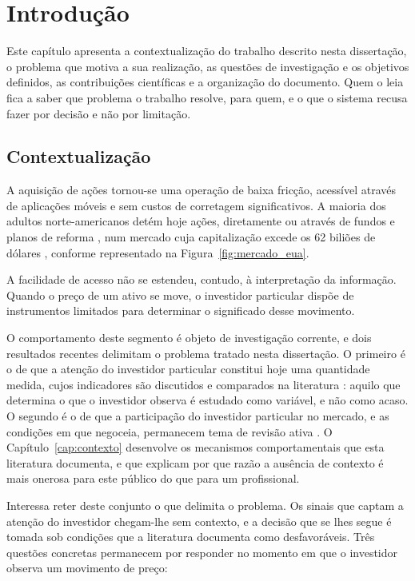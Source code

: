 \chapter{Introdução}
\label{cap:introducao}

Este capítulo apresenta a contextualização do trabalho descrito nesta dissertação, o problema
que motiva a sua realização, as questões de investigação e os objetivos definidos, as
contribuições científicas e a organização do documento. Quem o leia fica a saber que problema o trabalho resolve, para quem, e o que o sistema recusa fazer por decisão e não por limitação.

\section{Contextualização}
\label{sec:intro_origem}

A aquisição de ações tornou-se uma operação de baixa fricção, acessível através de aplicações
móveis e sem custos de corretagem significativos. A maioria dos adultos norte-americanos detém
hoje ações, diretamente ou através de fundos e planos de reforma \autocite{gallup2025stock}, num
mercado cuja capitalização excede os 62 biliões de dólares \autocite{sifma2025factbook}, conforme
representado na Figura~\ref{fig:mercado_eua}.

A facilidade de acesso não se estendeu, contudo, à interpretação da informação. Quando o preço de
um ativo se move, o investidor particular dispõe de instrumentos limitados para determinar o
significado desse movimento.

O comportamento deste segmento é objeto de investigação corrente, e dois resultados recentes
delimitam o problema tratado nesta dissertação. O primeiro é o de que a atenção do investidor
particular constitui hoje uma quantidade medida, cujos indicadores são discutidos e comparados na
literatura \autocite{cahill2025attention}: aquilo que determina o que o investidor observa é
estudado como variável, e não como acaso. O segundo é o de que a participação do investidor
particular no mercado, e as condições em que negoceia, permanecem tema de revisão ativa
\autocite{ernst2026retail}. O Capítulo~\ref{cap:contexto} desenvolve os mecanismos
comportamentais que esta literatura documenta, e que explicam por que razão a ausência de contexto
é mais onerosa para este público do que para um profissional.

Interessa reter deste conjunto o que delimita o problema. Os sinais que captam a atenção do
investidor chegam-lhe sem contexto, e a decisão que se lhes segue é tomada sob condições que a
literatura documenta como desfavoráveis. Três questões concretas permanecem por responder no
momento em que o investidor observa um movimento de preço:

